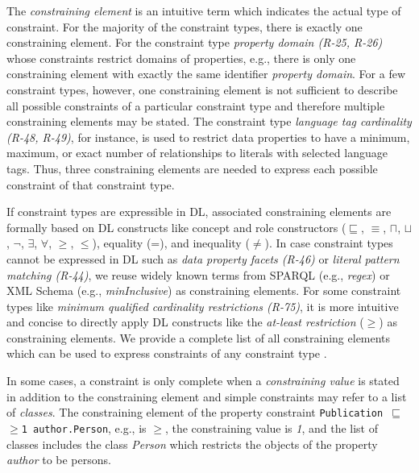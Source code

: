 \documentclass[a4paper,fontsize=11pt]{scrartcl}
\newcommand{\ms}[1]{\texttt{#1}}
\begin{document}
The \emph{constraining element} is an intuitive term which indicates the actual type of constraint. For the majority of the constraint types, there is exactly one constraining element. For the constraint type \emph{property domain (R-25, R-26)} whose constraints restrict domains of properties, e.g., there is only one constraining element with exactly the same identifier \emph{property domain}. For a few constraint types, however, one constraining element is not sufficient to describe all possible constraints of a particular constraint type and therefore multiple constraining elements may be stated. The constraint type \emph{language tag cardinality (R-48, R-49)}, for instance, is used to restrict data properties to have a minimum, maximum, or exact number of relationships to literals with selected language tags. Thus, three constraining elements are needed to express each possible constraint of that constraint type.

If constraint types are expressible in DL, associated constraining elements are formally based on DL constructs like concept and role constructors ($\sqsubseteq$, $\equiv$, $\sqcap$, $\sqcup$, $\neg$, $\exists$, $\forall$, $\geq$, $\leq$), equality (=), and inequality ($\ne$). In case constraint types cannot be expressed in DL such as \emph{data property facets (R-46)} or \emph{literal pattern matching (R-44)}, we reuse widely known terms from SPARQL (e.g., \emph{regex}) or XML Schema (e.g., \emph{minInclusive}) as constraining elements. For some constraint types like \emph{minimum qualified cardinality restrictions (R-75)}, it is more intuitive and concise to directly apply DL constructs like the \emph{at-least restriction} ($\geq$) as constraining elements. We provide a complete list of all constraining elements which can be used to express constraints of any constraint type \cite{BoschNolleAcarEckert2015}. 

In some cases, a constraint is only complete when a \emph{constraining value} is stated in addition to the constraining element
and simple constraints may refer to a list of \emph{classes}. The constraining element of the property constraint {\small\ms{Publication $\sqsubseteq$ $\geq$1 author.Person},} e.g., is \emph{$\geq$}, the constraining value is \emph{1}, and the list of classes includes the class \emph{Person} which restricts the objects of the property \emph{author} to be persons.
\end{document}

